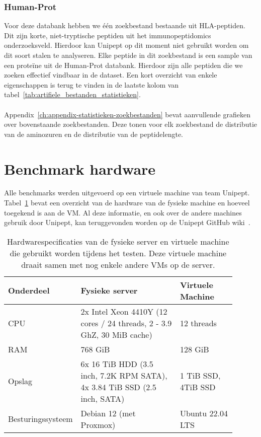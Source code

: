 \subsubsection{Human-Prot}
Voor deze databank hebben we één zoekbestand bestaande uit HLA-peptiden.
Dit zijn korte, niet-tryptische peptiden uit het immunopeptidomics onderzoeksveld.
Hierdoor kan Unipept op dit moment niet gebruikt worden om dit soort stalen te analyseren.
Elke peptide in dit zoekbestand is een sample van een proteïne uit de Human-Prot databank.
Hierdoor zijn alle peptiden die we zoeken effectief vindbaar in de dataset.
Een kort overzicht van enkele eigenschappen is terug te vinden in de laatste kolom van tabel~\ref{tab:artifiele_bestanden_statistieken}.
\\ \\
Appendix~\ref{ch:appendix-statistieken-zoekbestanden} bevat aanvullende grafieken over bovenstaande zoekbestanden.
Deze tonen voor elk zoekbestand de distributie van de aminozuren en de distributie van de peptidelengte.


\section{Benchmark hardware}\label{sec:benchmark-hardware}
Alle benchmarks werden uitgevoerd op een virtuele machine van team Unipept.
Tabel~\ref{tab:Matt_hardware} bevat een overzicht van de hardware van de fysieke machine en hoeveel toegekend is aan de VM\@.
Al deze informatie, en ook over de andere machines gebruik door Unipept, kan teruggevonden worden op de Unipept GitHub wiki~\cite{unipept_infrastructure}.

\begin{table}[h!]
    \centering
    \begin{tabular}{p{0.20\linewidth}p{0.45\linewidth}p{0.25\linewidth}}
        Onderdeel         & Fysieke server                                                            & Virtuele Machine    \\
        \hline\hline
        CPU               & 2x Intel Xeon 4410Y (12 cores / 24 threads, 2 - 3.9 GhZ, 30 MiB cache)    & 12 threads          \\
        RAM               & 768 GiB                                                                   & 128 GiB             \\
        Opslag            & 6x 16 TiB HDD (3.5 inch, 7.2K RPM SATA), 4x 3.84 TiB SSD (2.5 inch, SATA) & 1 TiB SSD, 4TiB SSD \\
        Besturingssysteem & Debian 12 (met Proxmox)                                                   & Ubuntu 22.04 LTS    \\
        \hline
    \end{tabular}
    \caption{Hardwarespecificaties van de fysieke server en virtuele machine die gebruikt worden tijdens het testen. Deze virtuele machine draait samen met nog enkele andere VMs op de server.}
    \label{tab:Matt_hardware}
\end{table}
